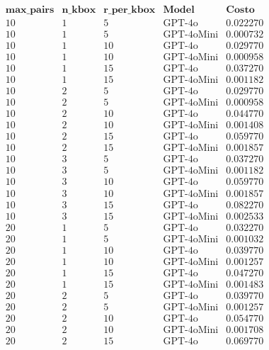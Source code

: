\documentclass[a4paper,12pt]{article}
\begin{document}
{\small
\[
\begin{array}{|cccc|c|}
\hline
\textbf{max\_pairs} & \textbf{n\_kbox} & \textbf{r\_per\_kbox} & \textbf{Model} & \textbf{Costo}\\
\hline
10 & 1 & 5 & \text{GPT-4o}     & 0.022270\\
10 & 1 & 5 & \text{GPT-4oMini} & 0.000732\\
10 & 1 & 10 & \text{GPT-4o}    & 0.029770\\
10 & 1 & 10 & \text{GPT-4oMini}& 0.000958\\
10 & 1 & 15 & \text{GPT-4o}    & 0.037270\\
10 & 1 & 15 & \text{GPT-4oMini}& 0.001182\\
10 & 2 & 5 & \text{GPT-4o}     & 0.029770\\
10 & 2 & 5 & \text{GPT-4oMini} & 0.000958\\
10 & 2 & 10 & \text{GPT-4o}    & 0.044770\\
10 & 2 & 10 & \text{GPT-4oMini}& 0.001408\\
10 & 2 & 15 & \text{GPT-4o}    & 0.059770\\
10 & 2 & 15 & \text{GPT-4oMini}& 0.001857\\
10 & 3 & 5 & \text{GPT-4o}     & 0.037270\\
10 & 3 & 5 & \text{GPT-4oMini} & 0.001182\\
10 & 3 & 10 & \text{GPT-4o}    & 0.059770\\
10 & 3 & 10 & \text{GPT-4oMini}& 0.001857\\
10 & 3 & 15 & \text{GPT-4o}    & 0.082270\\
10 & 3 & 15 & \text{GPT-4oMini}& 0.002533\\
\hline
20 & 1 & 5 & \text{GPT-4o}     & 0.032270\\
20 & 1 & 5 & \text{GPT-4oMini} & 0.001032\\
20 & 1 & 10 & \text{GPT-4o}    & 0.039770\\
20 & 1 & 10 & \text{GPT-4oMini}& 0.001257\\
20 & 1 & 15 & \text{GPT-4o}    & 0.047270\\
20 & 1 & 15 & \text{GPT-4oMini}& 0.001483\\
20 & 2 & 5 & \text{GPT-4o}     & 0.039770\\
20 & 2 & 5 & \text{GPT-4oMini} & 0.001257\\
20 & 2 & 10 & \text{GPT-4o}    & 0.054770\\
20 & 2 & 10 & \text{GPT-4oMini}& 0.001708\\
20 & 2 & 15 & \text{GPT-4o}    & 0.069770\\

\end{array}\]}
\end{document}
